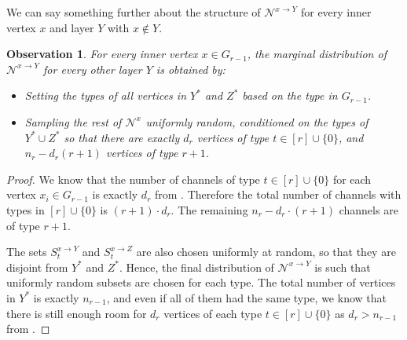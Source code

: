 \documentclass[11pt]{article}
\newtheorem{observation}[lemma]{Observation}
\theoremstyle{definition}
\newcommand{\Ystar}{\ensuremath{Y^{*}}}
\newcommand{\Zstar}{\ensuremath{Z^{*}}}
\newcommand{\Nbtogether}[2]{\ensuremath{\mathcal{N}^{#1_{#2}}}}
\newcommand{\Nbhood}[3]{\ensuremath{\mathcal{N}^{#1_{#3} \to #2}}}
\begin{document}
We can say something further about the structure of $\Nbhood{x}{Y}{}$ for every inner vertex $x$ and layer $Y$ with $x \notin Y$.
\begin{observation}\label{obs:input-vec}
For every inner vertex $x \in G_{r-1}$, the marginal distribution of $\Nbhood{x}{Y}{}$ for every other layer $Y$ is  obtained by:
\begin{itemize}
	\item Setting the types of all vertices in $\Ystar$ and $\Zstar$ based on the type in $G_{r-1}$. 
	\item Sampling the rest of $\Nbtogether{x}{}$ uniformly random, conditioned on the types of $\Ystar \cup \Zstar$ so that there are exactly $d_r$ vertices of type $t \in [r] \cup \{0\}$, and $n_r - d_r(r+1)$ vertices of type $r+1$.
\end{itemize}
\end{observation}
\begin{proof}
	We know that the number of channels of type $t \in [r] \cup \{0\}$ for each vertex $x_i \in G_{r-1}$ is exactly $d_r$ from . Therefore the total number of channels with types in $[r] \cup \{0\}$ is $(r+1) \cdot d_r$. The remaining $n_r - d_r \cdot (r+1)$ channels are of type $r+1$. 
	
	The sets $S_t^{x \to Y}$ and $S_t^{x \to Z}$ are also chosen uniformly at random, so that they are disjoint from $\Ystar$ and $\Zstar$. Hence, the final distribution of $\Nbhood{x}{Y}{}$ is such that uniformly random subsets are chosen for each type. The total number of vertices in $\Ystar$ is exactly $n_{r-1}$, and even if all of them had the same type, we know that there is still enough room for $d_r$ vertices of each type $t \in [r] \cup \{0\}$ as $d_r > n_{r-1}$ from .
\end{proof}
\end{document}
